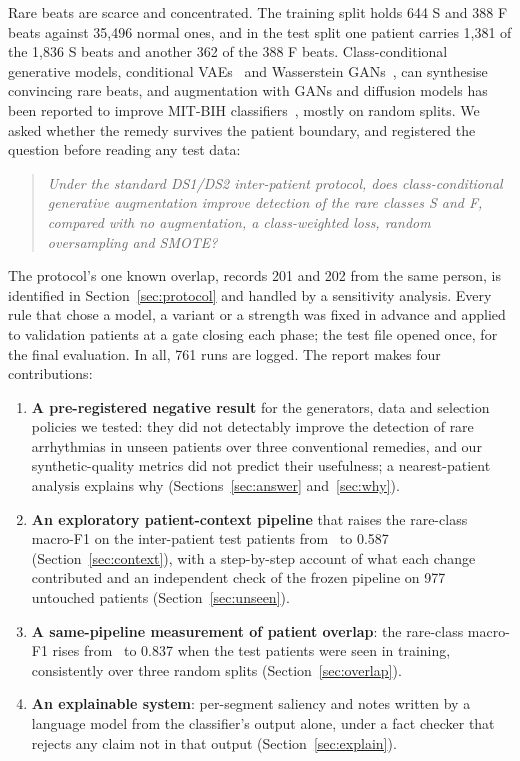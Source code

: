 \documentclass[10pt,a4paper]{article}
\begin{document}
Rare beats are scarce and concentrated. The training split holds 644 S and 388 F beats against 35,496 normal ones, and in the test
split one patient carries 1,381 of the 1,836 S beats and another 362 of the 388 F beats. Class-conditional generative models,
conditional VAEs~\cite{sohn2015cvae} and Wasserstein GANs~\cite{gulrajani2017wgangp}, can synthesise convincing rare beats, and
augmentation with GANs and diffusion models has been reported to improve MIT-BIH classifiers~\cite{shaker2020gan,kwak2024diffusion},
mostly on random splits. We asked whether the remedy survives the patient boundary, and registered the question before reading any
test data:
\begin{quote}\itshape
Under the standard DS1/DS2 inter-patient protocol, does class-conditional generative augmentation improve detection of the rare classes
S and F, compared with no augmentation, a class-weighted loss, random oversampling and SMOTE?
\end{quote}
The protocol's one known overlap, records 201 and 202 from the same person, is identified in Section~\ref{sec:protocol} and handled by a
sensitivity analysis. Every rule that chose a model, a variant or a strength was fixed in advance and applied to validation patients at a gate closing each
phase; the test file opened once, for the final evaluation. In all, 761 runs are logged. The report makes four contributions:
\begin{enumerate}\setlength{\itemsep}{1pt}
\item \textbf{A pre-registered negative result} for the generators, data and selection policies we tested: they did not detectably
improve the detection of rare arrhythmias in unseen patients over three conventional remedies, and our synthetic-quality metrics did
not predict their usefulness; a nearest-patient analysis explains why (Sections~\ref{sec:answer} and~\ref{sec:why}).
\item \textbf{An exploratory patient-context pipeline} that raises the rare-class macro-F1 on the inter-patient test patients from
\TestCnnCvaeRare\ to 0.587 (Section~\ref{sec:context}), with a step-by-step account of what each change contributed and an
independent check of the frozen pipeline on 977 untouched patients (Section~\ref{sec:unseen}).
\item \textbf{A same-pipeline measurement of patient overlap}: the rare-class macro-F1 rises from \TestCnnNoneRare\ to 0.837 when the
test patients were seen in training, consistently over three random splits (Section~\ref{sec:overlap}).
\item \textbf{An explainable system}: per-segment saliency and notes written by a language model from the classifier's output alone,
under a fact checker that rejects any claim not in that output (Section~\ref{sec:explain}).
\end{enumerate}
\end{document}
